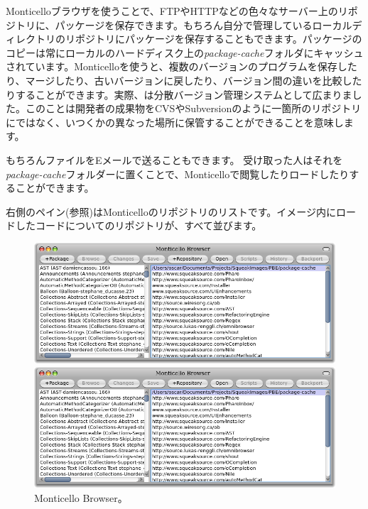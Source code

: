 \documentclass[a4paper,10pt,twoside]{book}
\begin{document}
Monticelloブラウザを使うことで、FTPやHTTPなどの色々なサーバー上のリポジトリに、パッケージを保存できます。もちろん自分で管理しているローカルディレクトリのリポジトリにパッケージを保存することもできます。パッケージのコピーは常にローカルのハードディスク上の\emph{package-cache}フォルダにキャッシュされています。Monticelloを使うと、複数のバージョンのプログラムを保存したり、マージしたり、古いバージョンに戻したり、バージョン間の違いを比較したりすることができます。実際、は分散バージョン管理システムとして広まりました。このことは開発者の成果物をCVSやSubversionのように一箇所のリポジトリにではなく、いつくかの異なった場所に保管することができることを意味します。

もちろんファイルをEメールで送ることもできます。
受け取った人はそれを\emph{package-cache}フォルダーに置くことで、Monticelloで閲覧したりロードしたりすることができます。

右側のペイン(参照)はMonticelloのリポジトリのリストです。イメージ内にロードしたコードについてのリポジトリが、すべて並びます。


\begin{figure}[hbt]
\ifluluelse
	{\centerline {\includegraphics[width=\textwidth]{MonticelloBrowser}}}
	{\centerline {\includegraphics[scale=0.7]{MonticelloBrowser}}}
\caption{Monticello Browser。
}
\end{figure}
\end{document}
